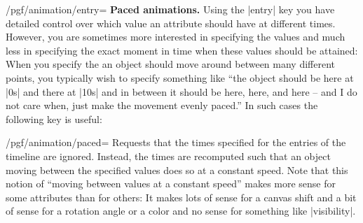\begin{key}{/pgf/animation/entry=}
  \medskip
  \textbf{Paced animations.}
  Using the |entry| key you have detailed control over which value an
  attribute should have at different times. However, you are sometimes
  more interested in specifying the values and much less in specifying
  the exact moment in time when these values should be attained: When
  you specify the an object should move around between many different
  points, you typically wish to specify something like ``the object
  should be here at |0s| and there at |10s| and in between it should be
  here, here, and here -- and I do not care when, just make the
  movement evenly paced.'' In such cases the following key is useful:
  \begin{key}{/pgf/animation/paced=}
    Requests that the times specified for the entries of the timeline
    are ignored. Instead, the times are recomputed such that an object
    moving between the specified values does so at a constant
    speed. Note that this notion of ``moving between values at a
    constant speed'' makes more sense for 
    some attributes than for others: It makes lots of sense for a
    canvas shift and a bit of sense for a rotation angle or a color
    and no sense for something like |visibility|.


\end{key}
\end{key}
